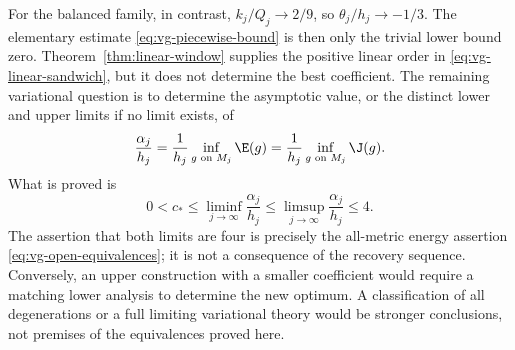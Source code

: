 For the balanced family, in contrast,
$k_j/Q_j\to2/9$, so $\theta_j/h_j\to-1/3$.
The elementary estimate \eqref{eq:vg-piecewise-bound} is then only
the trivial lower bound zero.  Theorem~\ref{thm:linear-window} supplies
the positive linear order in \eqref{eq:vg-linear-sandwich}, but it does
not determine the best coefficient.  The remaining variational question
is to determine the asymptotic value, or the distinct lower and upper
limits if no limit exists, of
\begin{equation}\label{eq:vg-open-coefficient}
 \frac{\alpha_j}{h_j}
 =\frac1{h_j}\inf_{g\text{ on }M_j}\E(g)
 =\frac1{h_j}\inf_{g\text{ on }M_j}\J(g).
\end{equation}
What is proved is
\[
 0<c_*\leq\liminf_{j\to\infty}\frac{\alpha_j}{h_j}
     \leq\limsup_{j\to\infty}\frac{\alpha_j}{h_j}\leq4.
\]
The assertion that both limits are four is precisely the all-metric
energy assertion \eqref{eq:vg-open-equivalences}; it is not a consequence
of the recovery sequence.  Conversely, an upper construction with a
smaller coefficient would require a matching lower analysis to determine
the new optimum.  A classification of all degenerations or a full
limiting variational theory would be stronger conclusions, not premises
of the equivalences proved here.
